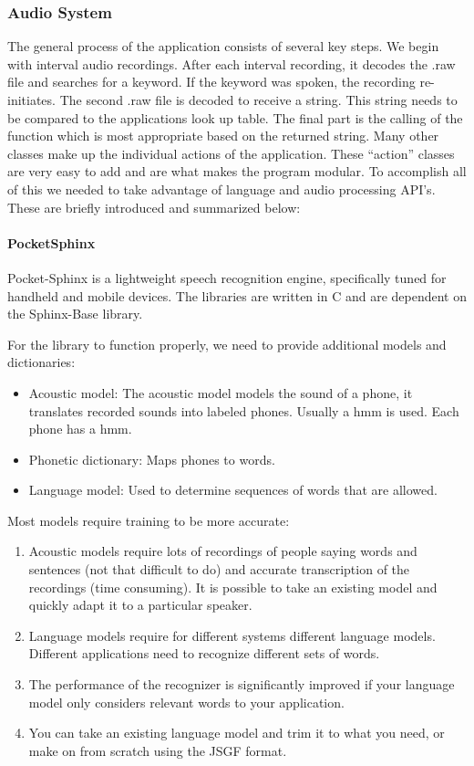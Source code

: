 \documentclass{article}
\begin{document}
\subsubsection{Audio System}
The general process of the application consists of several key steps. We begin with interval audio recordings. After each interval recording, it decodes the .raw file and searches for a keyword. If the keyword was spoken, the recording re-initiates. The second .raw file is decoded to receive a string. This string needs to be compared to the applications look up table. The final part is the calling of the function which is most appropriate based on the returned string. 
Many other classes make up the individual actions of the application. These “action” classes are very easy to add and are what makes the program modular. 
To accomplish all of this we needed to take advantage of language and audio processing API’s. These are briefly introduced and summarized below:

\paragraph{PocketSphinx} 
Pocket-Sphinx is a lightweight speech recognition engine, specifically tuned for handheld and mobile devices. The libraries are written in C and are dependent on the Sphinx-Base library. \vspace{12pt}

\noindent For the library to function properly, we need to provide additional models and dictionaries:
\begin{itemize}
	\item Acoustic model: The acoustic model models the sound of a phone, it translates recorded sounds into labeled phones. Usually a hmm is used. Each phone has a hmm. 
	\item Phonetic dictionary: Maps phones to words.
	\item Language model: Used to determine sequences of words that are allowed. 
\end{itemize}
	

\noindent Most models require training to be more accurate:
\begin{enumerate}
	\item Acoustic models require lots of recordings of people saying words and sentences (not that difficult to do) and accurate transcription of the recordings (time consuming). It is possible to take an existing model and quickly adapt it to a particular speaker.
	\item Language models require for different systems different language models. Different applications need to recognize different sets of words.
	\item The performance of the recognizer is significantly improved if your language model only considers relevant words to your application.
	\item You can take an existing language model and trim it to what you need, or make on from scratch using the JSGF format.
\end{enumerate}
	
\end{document}
